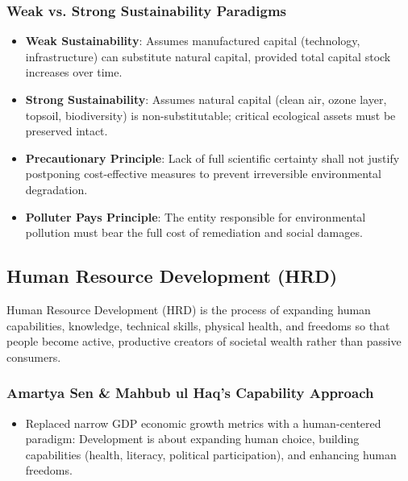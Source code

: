 \documentclass[11pt,a4paper]{article}
\begin{document}
\subsubsection{Weak vs. Strong Sustainability Paradigms}
\begin{itemize}[leftmargin=*]
  \item \textbf{Weak Sustainability}: Assumes manufactured capital (technology, infrastructure) can substitute natural capital, provided total capital stock increases over time.
  \item \textbf{Strong Sustainability}: Assumes natural capital (clean air, ozone layer, topsoil, biodiversity) is non-substitutable; critical ecological assets must be preserved intact.
  \item \textbf{Precautionary Principle}: Lack of full scientific certainty shall not justify postponing cost-effective measures to prevent irreversible environmental degradation.
  \item \textbf{Polluter Pays Principle}: The entity responsible for environmental pollution must bear the full cost of remediation and social damages.
\end{itemize}

\subsection{Human Resource Development (HRD)}

\begin{keybox}
Human Resource Development (HRD) is the process of expanding human capabilities, knowledge, technical skills, physical health, and freedoms so that people become active, productive creators of societal wealth rather than passive consumers.
\end{keybox}

\subsubsection{Amartya Sen \& Mahbub ul Haq's Capability Approach}
\begin{itemize}[leftmargin=*]
  \item Replaced narrow GDP economic growth metrics with a human-centered paradigm: Development is about expanding human choice, building capabilities (health, literacy, political participation), and enhancing human freedoms.
\end{itemize}
\end{document}
